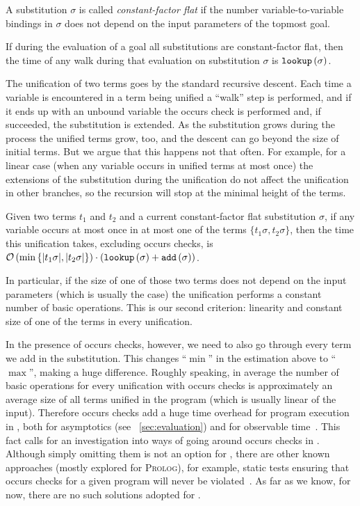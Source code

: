\begin{definition}
A substitution $\sigma$ is called \emph{constant-factor flat} if the number variable-to-variable bindings in $\sigma$ does not depend on the input parameters of the topmost goal.
\end{definition}

\begin{lemma}
If during the evaluation of a goal all substitutions are constant-factor flat, then the time of any walk during that evaluation on substitution $\sigma$ is $\texttt{lookup}\,(\sigma)$.
\end{lemma}

The unification of two terms goes by the standard recursive descent. Each time a variable is encountered in a term being unified a ``walk'' step is performed, and if it ends up with
an unbound variable the occurs check is performed and, if succeeded, the substitution is extended. As the substitution grows during the process  the unified terms grow,
too, and the descent can go beyond the size of initial terms. But we argue that this happens not that often. For example, for a linear case (when any variable occurs in unified terms at
most once) the extensions of the substitution during the unification do not affect the unification in other branches, so the recursion will stop at the minimal height of the terms. 

\begin{lemma}
  Given two terms $t_1$ and $t_2$ and a current constant-factor flat substitution $\sigma$, if any variable occurs at most once in at most one of the terms $\{t_1 \sigma, t_2 \sigma\}$,
  then the time this unification takes, excluding occurs checks, is $\mathcal{O}\,(\min\,\{|t_1 \sigma|, |t_2 \sigma|\}) \cdot (\texttt{lookup}\,(\sigma) + \texttt{add}\,(\sigma))$.
\end{lemma}

In particular, if the size of one of those two terms does not depend on the input parameters (which is usually the case) the unification performs a constant number of basic operations.
This is our second criterion: linearity and constant size of one of the terms in every unification.

In the presence of occurs checks, however, we need to also go through every term we add in the substitution. This changes ``$\min$'' in the estimation above to ``$\max$'', making a huge
difference. Roughly speaking, in average the number of basic operations for every unification with occurs checks is approximately an average size of all terms unified in the program
(which is usually linear of the input). Therefore occurs checks add a huge time overhead for program execution in \mK, both for asymptotics (see \sectionword~\ref{sec:evaluation})
and for observable time~\cite{WillThesis}. This fact calls for an investigation into ways of going around occurs checks in \mK. Although simply omitting them is not an option for \mK,
there are other known approaches (mostly explored for \textsc{Prolog}), for example, static tests ensuring that occurs checks for a given program will never be violated~\cite{OccursCheckStaticTest}.
As far as we know, for now, there are no such solutions adopted for \mK.

